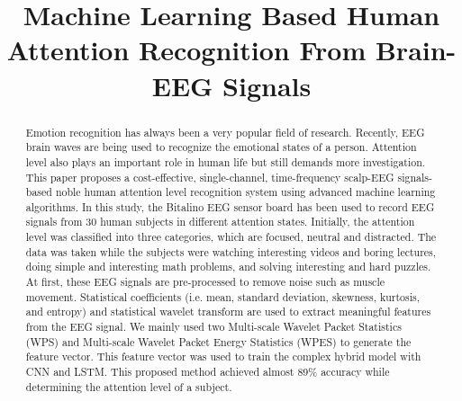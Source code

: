 \documentclass[conference]{IEEEtran}
\begin{document}
\title{Machine Learning Based Human Attention Recognition From Brain-EEG Signals}



\author{


}


\maketitle

\begin{abstract}
Emotion recognition has always been a very popular field of research. Recently, EEG brain waves are being used to recognize the emotional states of a person. Attention level also plays an
important role in human life but still demands more investigation. This paper proposes a cost-effective, single-channel, time-frequency scalp-EEG signals-based noble human attention level recognition system using
advanced machine learning algorithms. In this study, the Bitalino EEG sensor board has been used to record EEG signals from 30 human subjects in different attention states. Initially, the attention level was classified into three categories, which are focused, neutral and distracted. The data was taken while the subjects were watching interesting videos and boring lectures, doing simple and interesting math problems, and solving interesting and hard puzzles. At first, these EEG signals are pre-processed to remove noise such as muscle movement. Statistical coefficients (i.e. mean, standard deviation, skewness, kurtosis, and entropy) and statistical wavelet transform are used to extract meaningful features from the EEG signal. We mainly used two Multi-scale Wavelet Packet Statistics (WPS) and Multi-scale Wavelet Packet Energy Statistics (WPES) to generate the feature vector. This feature vector was used to train the complex hybrid model with CNN and LSTM. This proposed method achieved almost 89\% accuracy while determining the attention level of a subject.



\end{abstract}
\end{document}
